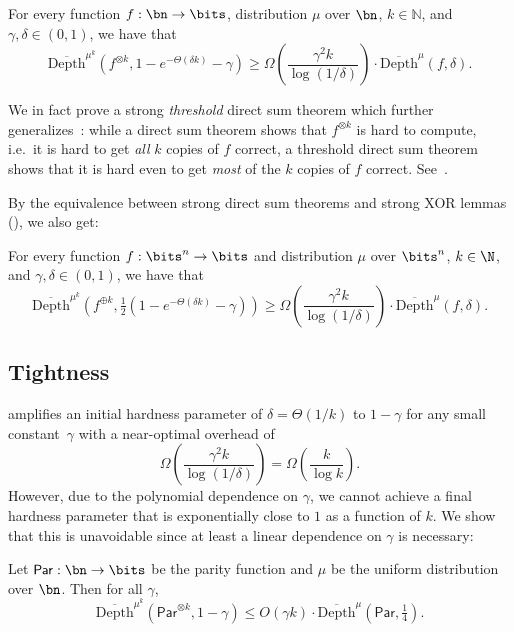 \begin{theorem}
\label{thm:main-formal} 
For every function $f: \bn \to \bits$, distribution $\mu$  over $\bn$, $k\in \mathbb{N}$, and $\gamma, \delta \in (0,1)$, we have that 
\[ 
 \overline{\mathrm{Depth}}^{\mu^k}(f^{\otimes k},1-e^{-\Theta(\delta k)}-\gamma) \ge \Omega\left( \frac{\gamma^2 k}{\log(1/\delta)}\right) \cdot \overline{\mathrm{Depth}}^{\mu}(f,\delta).
\] 
\end{theorem} 
We in fact prove a strong {\sl threshold} direct sum theorem which further generalizes~: while a direct sum theorem shows that $f^{\otimes k}$ is hard to compute, i.e.~it is hard to get {\sl all} $k$ copies of $f$ correct, a threshold direct sum theorem shows that it is hard even to get {\sl most} of the $k$ copies of $f$ correct. See~. 

By the equivalence between strong direct sum theorems and strong XOR lemmas (), we also get: 

\begin{theorem}
\label{thm:main-xor}
For every function $f:\bits^n\to\bits$ and distribution $\mu$ over $\bits^n$, $k\in\N$, and $\gamma,\delta\in(0,1)$, we have that
    $$
    \overline{\mathrm{Depth}}^{\mu^k}\left(f^{\oplus k},\tfrac{1}{2}(1-e^{-\Theta(\delta k)}-\gamma)\right)\ge {\Omega}\left(\frac{\gamma^2 k}{\log(1/\delta)}\right)\cdot\overline{\mathrm{Depth}}^\mu(f,\delta).
    $$
\end{theorem}

\subsection{Tightness}  amplifies an initial hardness parameter of $\delta = \Theta(1/k)$ to $1-\gamma$ for any small constant~$\gamma$ with a near-optimal overhead of 
\[ \Omega\left(\frac{\gamma^2 k}{\log(1/\delta)}\right) = \Omega\left(\frac{k}{\log k}\right).\]
However, due to the polynomial dependence on $\gamma$, we cannot achieve a final hardness parameter that is exponentially close to $1$ as a function of $k$. We show that this is unavoidable since at least a linear dependence on $\gamma$ is necessary:  

\begin{claim}
\label{claim:linear dependence on gamma}
        Let $\mathsf{Par} : \bn\to\bits$ be the parity function and $\mu $ be the uniform distribution over $\bn$. Then for all $\gamma$,
    \[
\overline{\mathrm{Depth}}^{\mu^k}(\mathsf{Par}^{\otimes k}, 1 -\gamma) \leq O(\gamma k) \cdot \overline{\mathrm{Depth}}^\mu(\mathsf{Par}, \tfrac1{4}).
    \]
\end{claim}

